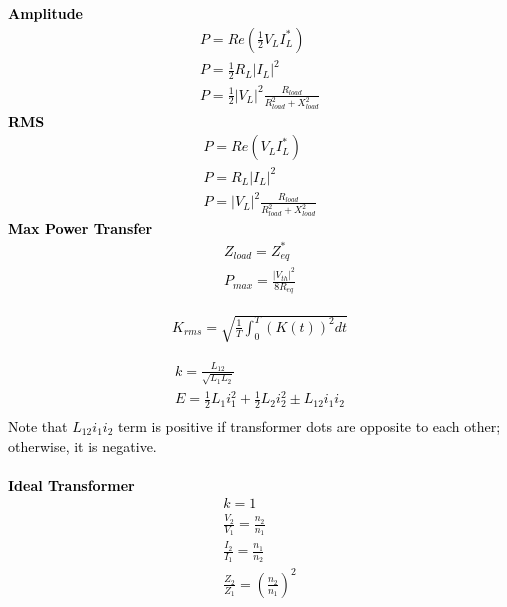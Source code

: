 \documentclass[a4paper,8pt]{extarticle} %
\newcommand{\mybox}[2]{
    \begin{tcolorbox}[colback=lightblue!5!white,colframe=lightblue!75!black,boxsep=1pt,arc=0pt,outer arc=0pt,title={\textcolor{black}{#1}}]
        \textcolor{black}{#2}
    \end{tcolorbox}
}
\begin{document}
\begin{multicols}{2}
\mybox{Power}{
\textbf{Amplitude}
\begin{subequations}
\begin{align}
    P = Re(\frac{1}{2}V_L I^*_L)\\
    P = \frac{1}{2}R_L |I_L|^2\\
    P = \frac{1}{2}|V_L|^2\frac{R_{load}}{R_{load}^2 + X_{load}^2}
\end{align}
\end{subequations}
\textbf{RMS}
\begin{subequations}
\begin{align}
    P = Re(V_L I^*_L)\\
    P = R_L |I_L|^2\\
    P = |V_L|^2 \frac{R_{load}}{R_{load}^2 + X_{load}^2}
\end{align}
\end{subequations}
\textbf{Max Power Transfer}
\begin{subequations}
\begin{align}
    Z_{load} = Z_{eq}^*\\
    P_{max} = \frac{|V_{th}|^2}{8R_{eq}}
\end{align}
\end{subequations}
}

\mybox{RMS Formula}{
\begin{subequations}
\begin{align}
    K_{rms} = \sqrt{\frac{1}{T} \int_0^T (K(t))^2 dt}
\end{align}
\end{subequations}
}

\mybox{Mutual Inductance}{
\begin{subequations}
\begin{align}
    k = \frac{L_{12}}{\sqrt{L_1L_2}} \\
    E = \frac{1}{2} L_1 i_1^2 + \frac{1}{2}L_2 i_2^2 \pm L_{12}i_1i_2 \\
\end{align}
\end{subequations}
Note that $L_{12}i_1i_2$ term is positive if transformer dots are opposite to each other; otherwise, it is negative. \\ \\ 
\textbf{Ideal Transformer}
\begin{subequations}
\begin{align}
    k = 1 \\
    \frac{V_2}{V_1} = \frac{n_2}{n_1} \\
    \frac{I_2}{I_1} = \frac{n_1}{n_2} \\
    \frac{Z_2}{Z_1} = \left( \frac{n_2}{n_1} \right)^2
\end{align}
\end{subequations}
}


\end{multicols}
\end{document}
